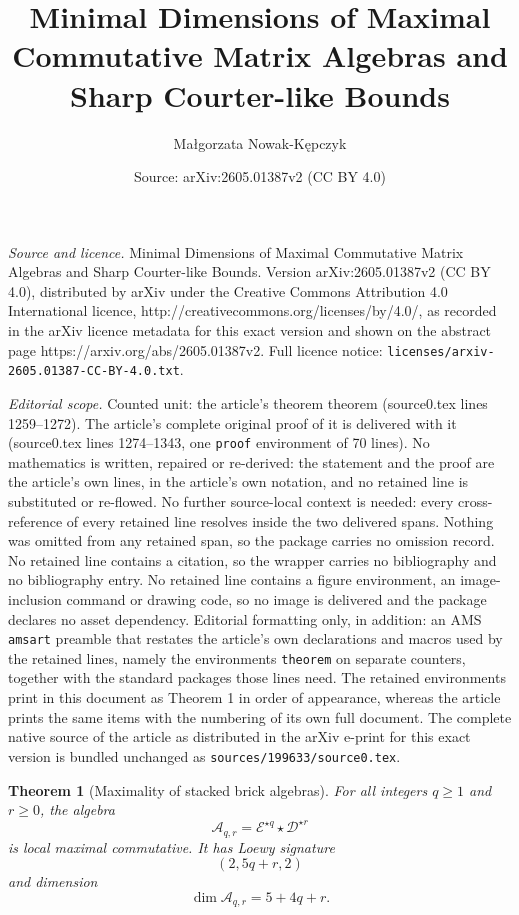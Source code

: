\documentclass[10pt,a4paper]{amsart}
\title{Minimal Dimensions of Maximal Commutative Matrix Algebras and Sharp Courter-like Bounds}
\author{Ma{\l}gorzata Nowak-K\k{e}pczyk}
\date{Source: arXiv:2605.01387v2 (CC BY 4.0)}
\newtheorem{theorem}{Theorem}
\begin{document}
\maketitle

\noindent\emph{Source and licence.} Minimal Dimensions of Maximal Commutative Matrix Algebras and Sharp Courter-like Bounds. Version arXiv:2605.01387v2 (CC BY 4.0), distributed by arXiv under the Creative Commons Attribution 4.0 International licence, http://creativecommons.org/licenses/by/4.0/, as recorded in the arXiv licence metadata for this exact version and shown on the abstract page https://arxiv.org/abs/2605.01387v2. Full licence notice: \texttt{licenses/arxiv-2605.01387-CC-BY-4.0.txt}.\par\smallskip

\noindent\textit{Editorial scope.} Counted unit: the article's theorem theorem (source0.tex lines 1259--1272). The article's complete original proof of it is delivered with it (source0.tex lines 1274--1343, one \texttt{proof} environment of 70 lines). No mathematics is written, repaired or re-derived: the statement and the proof are the article's own lines, in the article's own notation, and no retained line is substituted or re-flowed.  No further source-local context is needed: every cross-reference of every retained line resolves inside the two delivered spans.  Nothing was omitted from any retained span, so the package carries no omission record.  No retained line contains a citation, so the wrapper carries no bibliography and no bibliography entry.  No retained line contains a figure environment, an image-inclusion command or drawing code, so no image is delivered and the package declares no asset dependency.  Editorial formatting only, in addition: an AMS \texttt{amsart} preamble that restates the article's own declarations and macros used by the retained lines, namely the environments \texttt{theorem} on separate counters, together with the standard packages those lines need.  The retained environments print in this document as Theorem 1 in order of appearance, whereas the article prints the same items with the numbering of its own full document.  The complete native source of the article as distributed in the arXiv e-print for this exact version is bundled unchanged as \texttt{sources/199633/source0.tex}.
\begin{theorem}[Maximality of stacked brick algebras]
	For all integers \(q\ge 1\) and \(r\ge 0\), the algebra
	\[
	\mathcal A_{q,r}=\mathcal E^{\star q}\star\mathcal D^{\star r}
	\]
	is local maximal commutative. It has Loewy signature
	\[
	(2,5q+r,2)
	\]
	and dimension
	\[
	\dim \mathcal A_{q,r}=5+4q+r.
	\]
\end{theorem}
\end{document}
